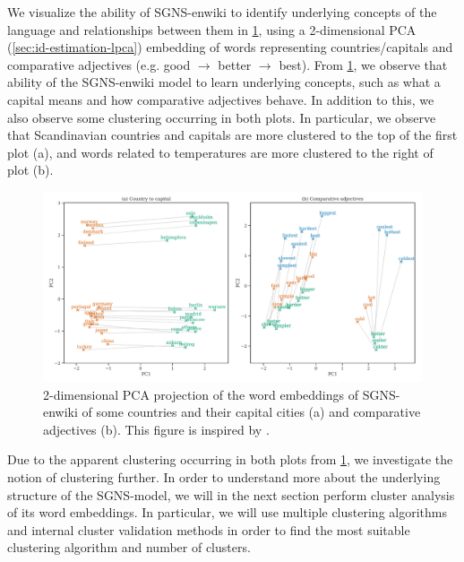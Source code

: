 We visualize the ability of SGNS-enwiki to identify underlying concepts of the language and relationships between them in \cref{fig:sgns-enwiki-word-to-word-relations-pca-2d}, using a 2-dimensional PCA (\cref{sec:id-estimation-lpca}) embedding of words representing countries/capitals and comparative adjectives (e.g. good $\rightarrow$ better $\rightarrow$ best). From \cref{fig:sgns-enwiki-word-to-word-relations-pca-2d}, we observe that ability of the SGNS-enwiki model to learn underlying concepts, such as what a capital means and how comparative adjectives behave. In addition to this, we also observe some clustering occurring in both plots. In particular, we observe that Scandinavian countries and capitals are more clustered to the top of the first plot (a), and words related to temperatures are more clustered to the right of plot (b).
\begin{figure}[H]
   \centering
   \includegraphics[width=\textwidth]{thesis/figures/word-to-word-relationships-pca-2d.pdf}
 \caption{2-dimensional PCA projection of the word embeddings of SGNS-enwiki of some countries and their capital cities (a) and comparative adjectives (b). This figure is inspired by \cite[Figure 2]{mikolov2013b}.}
 \label{fig:sgns-enwiki-word-to-word-relations-pca-2d}
\end{figure}

Due to the apparent clustering occurring in both plots from \cref{fig:sgns-enwiki-word-to-word-relations-pca-2d}, we investigate the notion of clustering further. In order to understand more about the underlying structure of the SGNS-model, we will in the next section perform cluster analysis of its word embeddings. In particular, we will use multiple clustering algorithms and internal cluster validation methods in order to find the most suitable clustering algorithm and number of clusters.